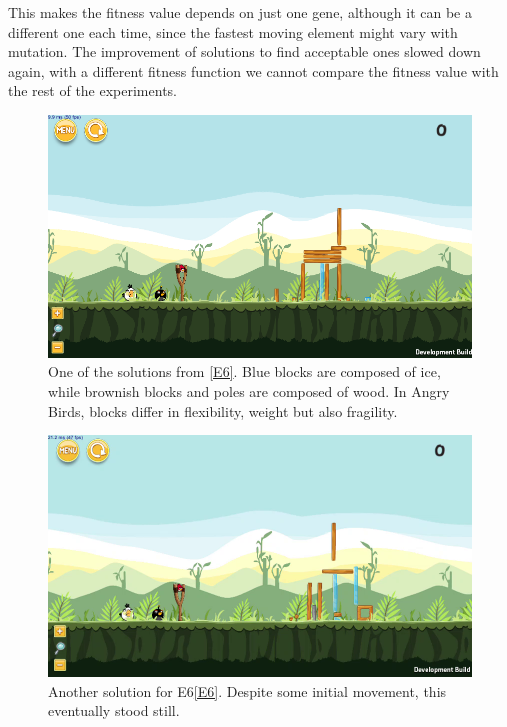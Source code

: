\documentclass[a4paper,twoside]{article}
\begin{document}
This makes the fitness value depends on just one gene, although it can be a
different one each time, since the fastest moving element might vary
with mutation. The improvement of solutions to find acceptable ones
slowed down 
again, with a different fitness function we cannot compare the fitness
value with the rest of the experiments. 
%
\begin{figure}
 	\centering
 	\includegraphics[scale=0.32]{E6.png}
 	\caption{One of the solutions from \ref{E6}. Blue blocks are
          composed of ice, while brownish blocks and poles are
          composed of wood. In Angry Birds, blocks differ in
          flexibility, weight but also fragility.}\label{f:e6}
\end{figure}
%
\begin{figure}
 	\centering
 	\includegraphics[scale=0.25]{Images/e6-2.png}
 	\caption{Another solution for E6\ref{E6}. Despite some initial
        movement, this eventually stood still.}\label{f:e6:2}
 \end{figure}
\end{document}

